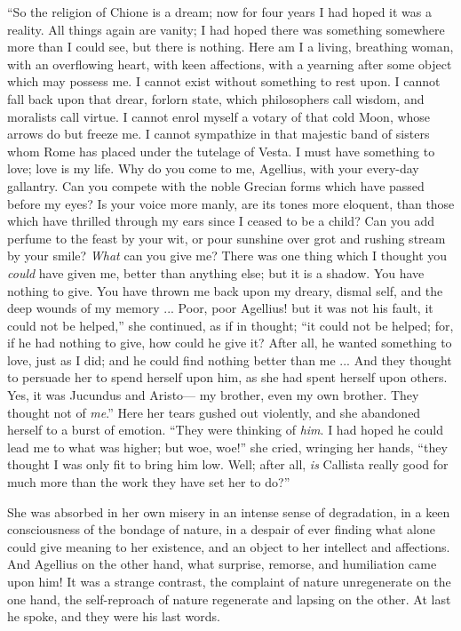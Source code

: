 ``So the religion of Chione is a dream; now for four years I
had hoped it was a reality. All things again are vanity; I had hoped
there was something somewhere more than I could see, but there is
nothing. Here am I a living, breathing woman, with an overflowing
heart, with keen affections, with a yearning after some object
which may possess me. I cannot exist without something to rest upon. I
cannot fall back upon that drear, forlorn state, which philosophers
call wisdom, and moralists call virtue. I cannot enrol myself a
votary of that cold Moon, whose arrows do but freeze me. I cannot
sympathize in that majestic band of sisters whom Rome has placed under
the tutelage of Vesta. I must have something to love; love is my life.
Why do you come to me, Agellius, with your every-day gallantry. Can
you compete with the noble Grecian forms which have passed before my
eyes? Is your voice more manly, are its tones more eloquent, than
those which have thrilled through my ears since I ceased to be a
child? Can you add perfume to the feast by your wit, or pour sunshine
over grot and rushing stream by your smile? \emph{What} can you give me?
There was one thing which I thought you \emph{could} have given me, better
than anything else; but it is a shadow. You have nothing to give. You
have thrown me back upon my dreary, dismal self, and the deep wounds
of my memory ... Poor, poor Agellius! but it was not his fault, it
could not be helped,'' she continued, as if in thought; ``it
could not be helped; for, if he had nothing to give, how could he give
it? After all, he wanted something to love, just as I did; and he
could find nothing better than me ... And they thought to persuade her
to spend herself upon him, as she had spent herself upon others. Yes,
it was Jucundus and Aristo— my brother, even my own brother.
They thought not of \emph{me}.'' Here her tears gushed out
violently, and she abandoned herself to a burst of emotion. ``They
were thinking of \emph{him}. I had hoped he could lead me to what was
higher; but woe, woe!'' she cried, wringing her hands, ``they
thought I was only fit to bring him low. Well; after all, \emph{is}
Callista really good for much more than the work they have set her to
do?''

She was absorbed in her own misery in an intense sense of
degradation, in a keen consciousness of the bondage of nature, in a
despair of ever finding what alone could give meaning to her
existence, and an object to her intellect and affections. And Agellius
on the other hand, what surprise, remorse, and humiliation came upon
him! It was a strange contrast, the complaint of nature unregenerate
on the one hand, the self-reproach of nature regenerate and lapsing on
the other. At last he spoke, and they were his last words.

